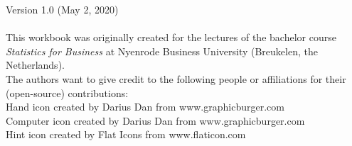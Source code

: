 \vspace*{\fill} 

{\fontsize{8}{10}\selectfont

Version 1.0 (May 2, 2020) \\
\\
This workbook was originally created for the lectures of the bachelor course \textit{Statistics for Business} at Nyenrode Business University (Breukelen, the Netherlands). \\

The authors want to give credit to the following people or affiliations for their (open-source) contributions: \\

Hand icon created by Darius Dan from www.graphicburger.com \\
Computer icon created by Darius Dan from www.graphicburger.com \\
Hint icon created by Flat Icons from www.flaticon.com \\

}
